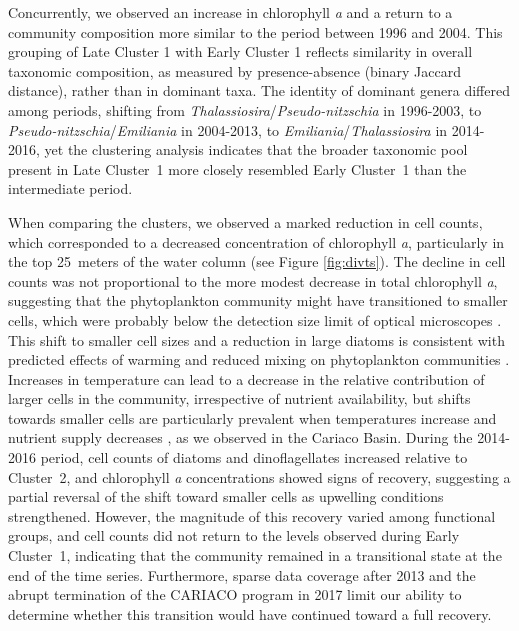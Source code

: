 \documentclass[]{agujournal2019}
\begin{document}
    Concurrently, we observed an increase in chlorophyll \textit{a} and a return to a community composition more similar to the period between 1996 and 2004. 
     This grouping of Late Cluster 1 with Early Cluster 1 reflects similarity in overall taxonomic composition, as measured by presence-absence (binary Jaccard distance), rather than in dominant taxa. The identity of dominant genera differed among periods, shifting from \textit{Thalassiosira}/\textit{Pseudo-nitzschia} in 1996-2003, to \textit{Pseudo-nitzschia}/\textit{Emiliania} in 2004-2013, to \textit{Emiliania}/\textit{Thalassiosira} in 2014-2016, yet the clustering analysis indicates that the broader taxonomic pool present in Late Cluster~1 more closely resembled Early Cluster~1 than the intermediate period.

    When comparing the clusters, we observed a marked reduction in cell counts, which corresponded to a decreased concentration of chlorophyll \textit{a}, particularly in the top \qty{25}{meters} of the water column (see Figure \ref{fig:divts}). The decline in cell counts was not proportional to the more modest decrease in total chlorophyll \textit{a}, suggesting that the phytoplankton community might have transitioned to smaller cells, which were probably below the detection size limit of optical microscopes \cite{muller-karger_scientific_2019}.  This shift to smaller cell sizes and a reduction in large diatoms is consistent with predicted effects of warming and reduced mixing on phytoplankton communities \cite{bopp_response_2005}. Increases in temperature can lead to a decrease in the relative contribution of larger cells in the community, irrespective of nutrient availability, but shifts towards smaller cells are particularly prevalent when temperatures increase and nutrient supply decreases \cite{acevedo-trejos_glimpse_2014, mousing_global_2014}, as we observed in the Cariaco Basin. During the 2014-2016 period, cell counts of diatoms and dinoflagellates increased relative to Cluster~2, and chlorophyll \textit{a} concentrations showed signs of recovery, suggesting a partial reversal of the shift toward smaller cells as upwelling conditions strengthened. However, the magnitude of this recovery varied among functional groups, and cell counts did not return to the levels observed during Early Cluster~1, indicating that the community remained in a transitional state at the end of the time series. Furthermore, sparse data coverage after 2013 and the abrupt termination of the CARIACO program in 2017 limit our ability to determine whether this transition would have continued toward a full recovery. 
\end{document}
